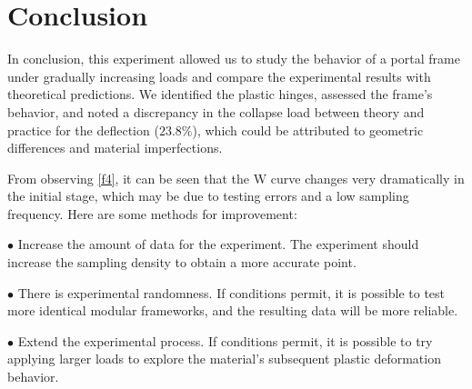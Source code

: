 \section{Conclusion}

In conclusion, this experiment allowed us to study the behavior of a portal frame under gradually increasing loads and compare the experimental results with theoretical predictions. We identified the plastic hinges, assessed the frame's behavior, and noted a discrepancy in the collapse load between theory and practice for the deflection ($23.8\%$), which could be attributed to geometric differences and material imperfections.

From observing \autoref{f4}, it can be seen that the W curve changes very dramatically in the initial stage, which may be due to testing errors and a low sampling frequency. Here are some methods for improvement:

$\bullet$ Increase the amount of data for the experiment. The experiment should increase the sampling density to obtain a more accurate point.

$\bullet$ There is experimental randomness. If conditions permit, it is possible to test more identical modular frameworks, and the resulting data will be more reliable.

$\bullet$ Extend the experimental process. If conditions permit, it is possible to try applying larger loads to explore the material's subsequent plastic deformation behavior.